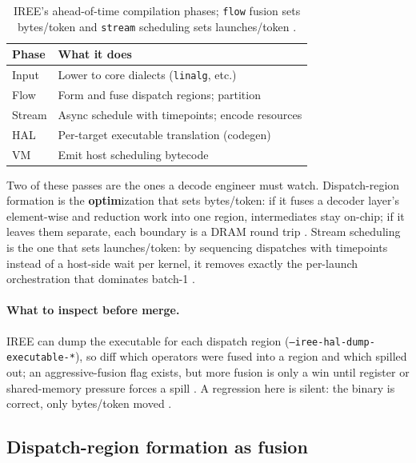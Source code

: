 \begin{table}[t]
\centering
\caption{IREE's ahead-of-time compilation phases; \texttt{flow} fusion sets bytes/token and \texttt{stream} scheduling sets launches/token \citep{iree2024}.}
\label{tab:ch18_iree_phases}
\begin{tabular}{ll}
\toprule
Phase & What it does \\
\midrule
Input & Lower to core dialects (\texttt{linalg}, etc.) \\
Flow & Form and fuse dispatch regions; partition \\
Stream & Async schedule with timepoints; encode resources \\
HAL & Per-target executable translation (codegen) \\
VM & Emit host scheduling bytecode \\
\bottomrule
\end{tabular}
\end{table}

Two of these passes are the ones a decode engineer must watch. Dispatch-region formation is the \textbf{optim}ization that sets bytes/token: if it fuses a decoder layer's element-wise and reduction work into one region, intermediates stay on-chip; if it leaves them separate, each boundary is a DRAM round trip \citep{taxbreak2026,memoryfloor2026}. Stream scheduling is the one that sets launches/token: by sequencing dispatches with timepoints instead of a host-side wait per kernel, it removes exactly the per-launch orchestration that dominates batch-1 \citep{iree2024,nvidia2024cudagraphs}.

\paragraph{What to inspect before merge.} IREE can dump the executable for each dispatch region (\texttt{--iree-hal-dump-executable-*}), so diff which operators were fused into a region and which spilled out; an aggressive-fusion flag exists, but more fusion is only a win until register or shared-memory pressure forces a spill \citep{iree2024,patel2025llminference}. A regression here is silent: the binary is correct, only bytes/token moved \citep{dlbook}.

\subsection{Dispatch-region formation as fusion}

